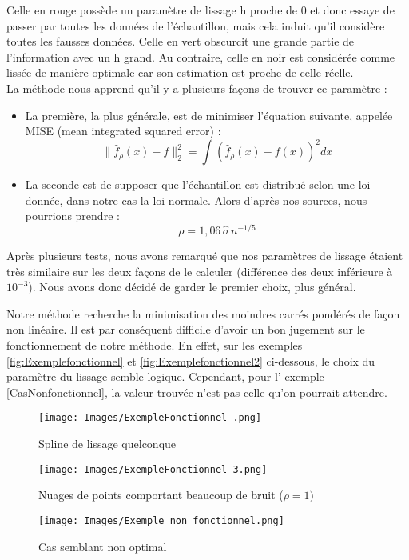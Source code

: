 \documentclass[a4paper,12pt]{article} %
\begin{document}
                Celle en rouge possède un paramètre de lissage h proche de 0 et donc essaye de passer par toutes les données de l'échantillon, mais cela induit qu'il considère toutes les fausses données. Celle en vert obscurcit une grande partie de l'information avec un h grand. Au contraire, celle en noir est considérée comme lissée de manière optimale car son estimation est proche de celle réelle.\\
               
                La méthode nous apprend qu'il y a plusieurs façons de trouver ce paramètre :
                \begin{itemize}
                        \item   La première, la plus générale, est de minimiser l'équation suivante, appelée MISE (mean integrated squared error) \cite{MISE} :
                        \[\|{\widehat{f}}_{\rho}(x)-f\|_{2}^{2}=\operatorname \int ({\widehat{f}}_{\rho}(x)-f(x))^{2}dx\]
                        \item 	La seconde est de supposer que l'échantillon est distribué selon une loi donnée, dans notre cas la loi normale. Alors d'après nos sources, nous pourrions prendre : 
                        \[ \rho=1,06\,{\widehat {\sigma }}\,n^{-1/5}\]
                \end{itemize}
                
                Après plusieurs tests, nous avons remarqué que nos paramètres de lissage étaient très similaire sur les deux façons de le calculer (différence des deux inférieure à $10^{-3}$). Nous avons donc décidé de garder le premier choix, plus général.
                
                Notre méthode recherche la minimisation des moindres carrés pondérés de façon non linéaire. Il est par conséquent difficile d'avoir un bon jugement sur le fonctionnement de notre méthode. En effet, sur les exemples \ref{fig:Exemplefonctionnel} et \ref{fig:Exemplefonctionnel2}  ci-dessous, le choix du paramètre du lissage semble logique. Cependant, pour l' exemple \ref{CasNonfonctionnel}, la valeur trouvée n'est pas celle qu'on pourrait attendre.

                
                \begin{figure}[H]
                    \texttt{[image: Images/ExempleFonctionnel .png]}
                     \caption{Spline de lissage quelconque\\}\label{fig:Exemplefonctionnel}
                \endminipage\hfill
                    \texttt{[image: Images/ExempleFonctionnel 3.png]}
                     \caption{Nuages de points comportant beaucoup de bruit ($\rho = 1)$ }\label{fig:Exemplefonctionnel2}
                \endminipage\hfill
                    \texttt{[image: Images/Exemple non fonctionnel.png]}
                    \caption{Cas semblant non optimal\\}\label{fig:ExempleNonfonctionnel1}
                \endminipage
                \end{figure}
\end{document}
